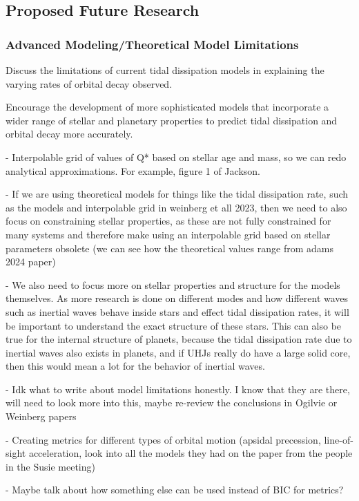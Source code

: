 \documentclass[oneside,12pt]{amsart}
\numberwithin{page}{section}
\begin{document}
\clearpage


\subsection{Proposed Future Research}

\subsubsection{Advanced Modeling/Theoretical Model Limitations}
Discuss the limitations of current tidal dissipation models in explaining the varying rates of orbital decay observed.

Encourage the development of more sophisticated models that incorporate a wider range of stellar and planetary properties to predict tidal dissipation and orbital decay more accurately.

- Interpolable grid of values of Q* based on stellar age and mass, so we can redo analytical approximations. For example, figure 1 of Jackson. 

- If we are using theoretical models for things like the tidal dissipation rate, such as the models and interpolable grid in weinberg et all 2023, then we need to also focus on constraining stellar properties, as these are not fully constrained for many systems and therefore make using an interpolable grid based on stellar parameters obsolete (we can see how the theoretical values range from adams 2024 paper)

- We also need to focus more on stellar properties and structure for the models themselves. As more research is done on different modes and how different waves such as inertial waves behave inside stars and effect tidal dissipation rates, it will be important to understand the exact structure of these stars. This can also be true for the internal structure of planets, because the tidal dissipation rate due to inertial waves also exists in planets, and if UHJs really do have a large solid core, then this would mean a lot for the behavior of inertial waves. 

- Idk what to write about model limitations honestly. I know that they are there, will need to look more into this, maybe re-review the conclusions in Ogilvie or Weinberg papers

- Creating metrics for different types of orbital motion (apsidal precession, line-of-sight acceleration, look into all the models they had on the paper from the people in the Susie meeting)

- Maybe talk about how something else can be used instead of BIC for metrics?
\end{document}
